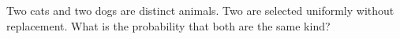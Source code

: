 Two cats and two dogs are distinct animals. Two are selected uniformly without replacement. What is the probability that both are the same kind?
